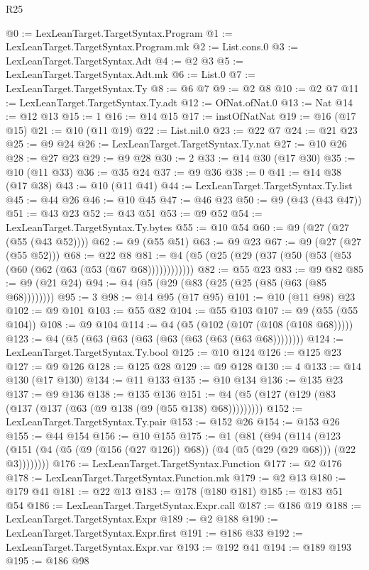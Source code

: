 \begin{lexlean}{R25}
\begin{coremodule}
@0 := LexLeanTarget.TargetSyntax.Program
@1 := LexLeanTarget.TargetSyntax.Program.mk
@2 := List.cons.{0}
@3 := LexLeanTarget.TargetSyntax.Adt
@4 := @2 @3
@5 := LexLeanTarget.TargetSyntax.Adt.mk
@6 := List.{0}
@7 := LexLeanTarget.TargetSyntax.Ty
@8 := @6 @7
@9 := @2 @8
@10 := @2 @7
@11 := LexLeanTarget.TargetSyntax.Ty.adt
@12 := OfNat.ofNat.{0}
@13 := Nat
@14 := @12 @13
@15 := 1
@16 := @14 @15
@17 := instOfNatNat
@19 := @16 (@17 @15)
@21 := @10 (@11 @19)
@22 := List.nil.{0}
@23 := @22 @7
@24 := @21 @23
@25 := @9 @24
@26 := LexLeanTarget.TargetSyntax.Ty.nat
@27 := @10 @26
@28 := @27 @23
@29 := @9 @28
@30 := 2
@33 := @14 @30 (@17 @30)
@35 := @10 (@11 @33)
@36 := @35 @24
@37 := @9 @36
@38 := 0
@41 := @14 @38 (@17 @38)
@43 := @10 (@11 @41)
@44 := LexLeanTarget.TargetSyntax.Ty.list
@45 := @44 @26
@46 := @10 @45
@47 := @46 @23
@50 := @9 (@43 (@43 @47))
@51 := @43 @23
@52 := @43 @51
@53 := @9 @52
@54 := LexLeanTarget.TargetSyntax.Ty.bytes
@55 := @10 @54
@60 := @9 (@27 (@27 (@55 (@43 @52))))
@62 := @9 (@55 @51)
@63 := @9 @23
@67 := @9 (@27 (@27 (@55 @52)))
@68 := @22 @8
@81 := @4 (@5 (@25 (@29 (@37 (@50 (@53 (@53 (@60 (@62 (@63 (@53 (@67 @68))))))))))))
@82 := @55 @23
@83 := @9 @82
@85 := @9 (@21 @24)
@94 := @4 (@5 (@29 (@83 (@25 (@25 (@85 (@63 (@85 @68))))))))
@95 := 3
@98 := @14 @95 (@17 @95)
@101 := @10 (@11 @98) @23
@102 := @9 @101
@103 := @55 @82
@104 := @55 @103
@107 := @9 (@55 (@55 @104))
@108 := @9 @104
@114 := @4 (@5 (@102 (@107 (@108 (@108 @68)))))
@123 := @4 (@5 (@63 (@63 (@63 (@63 (@63 (@63 (@63 @68))))))))
@124 := LexLeanTarget.TargetSyntax.Ty.bool
@125 := @10 @124
@126 := @125 @23
@127 := @9 @126
@128 := @125 @28
@129 := @9 @128
@130 := 4
@133 := @14 @130 (@17 @130)
@134 := @11 @133
@135 := @10 @134
@136 := @135 @23
@137 := @9 @136
@138 := @135 @136
@151 := @4 (@5 (@127 (@129 (@83 (@137 (@137 (@63 (@9 @138 (@9 (@55 @138) @68)))))))))
@152 := LexLeanTarget.TargetSyntax.Ty.pair
@153 := @152 @26
@154 := @153 @26
@155 := @44 @154
@156 := @10 @155
@175 := @1
    (@81
      (@94
        (@114
          (@123 (@151 (@4 (@5 (@9 (@156 (@27 @126)) @68)) (@4 (@5 (@29 (@29 @68))) (@22 @3))))))))
@176 := LexLeanTarget.TargetSyntax.Function
@177 := @2 @176
@178 := LexLeanTarget.TargetSyntax.Function.mk
@179 := @2 @13
@180 := @179 @41
@181 := @22 @13
@183 := @178 (@180 @181)
@185 := @183 @51 @54
@186 := LexLeanTarget.TargetSyntax.Expr.call
@187 := @186 @19
@188 := LexLeanTarget.TargetSyntax.Expr
@189 := @2 @188
@190 := LexLeanTarget.TargetSyntax.Expr.first
@191 := @186 @33
@192 := LexLeanTarget.TargetSyntax.Expr.var
@193 := @192 @41
@194 := @189 @193
@195 := @186 @98

\end{coremodule}
\end{lexlean}

